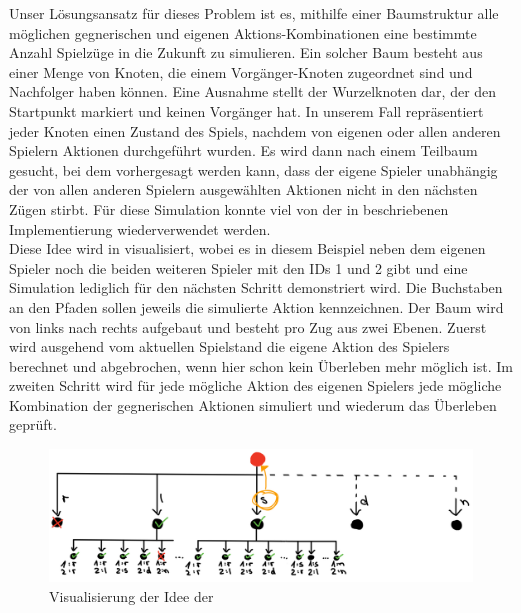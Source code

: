 Unser Lösungsansatz für dieses Problem ist es, mithilfe einer Baumstruktur alle möglichen gegnerischen und eigenen
Aktions-Kombinationen eine bestimmte Anzahl Spielzüge in die Zukunft zu simulieren.
Ein solcher Baum besteht aus einer Menge von Knoten, die einem Vorgänger-Knoten zugeordnet sind und Nachfolger haben
können.
Eine Ausnahme stellt der Wurzelknoten dar, der den Startpunkt markiert und keinen Vorgänger hat.
In unserem Fall repräsentiert jeder Knoten einen Zustand des Spiels, nachdem von eigenen oder allen anderen Spielern
Aktionen durchgeführt wurden.
Es wird dann nach einem Teilbaum gesucht, bei dem vorhergesagt werden kann, dass der eigene Spieler unabhängig der von
allen anderen Spielern ausgewählten Aktionen nicht in den nächsten Zügen stirbt.
Für diese Simulation konnte viel von der in  beschriebenen Implementierung
wiederverwendet werden. \\

Diese Idee wird in  visualisiert, wobei es in diesem Beispiel neben dem
eigenen Spieler noch die beiden weiteren Spieler mit den IDs 1 und 2 gibt und eine Simulation lediglich für den nächsten
Schritt demonstriert wird.
Die Buchstaben an den Pfaden sollen jeweils die simulierte Aktion kennzeichnen.
Der Baum wird von links nach rechts aufgebaut und besteht pro Zug aus zwei Ebenen.
Zuerst wird ausgehend vom aktuellen Spielstand die eigene Aktion des Spielers berechnet und abgebrochen, wenn hier schon
kein Überleben mehr möglich ist.
Im zweiten Schritt wird für jede mögliche Aktion des eigenen Spielers jede mögliche Kombination der gegnerischen
Aktionen simuliert und wiederum das Überleben geprüft. \\

\begin{figure}[htb]
\centering
\includegraphics[width=\textwidth]{Bilder/SearchTreeAIVisualisierung.jpg}
\caption{Visualisierung der Idee der }
\label{fig:SearchTreeAIVisualisierung}
\end{figure}

